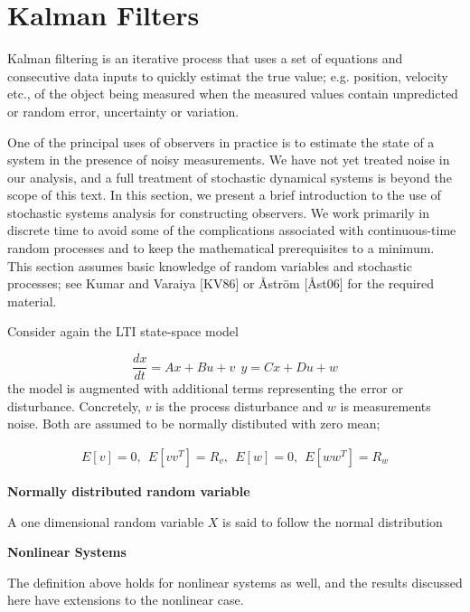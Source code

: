 \chapter{Kalman Filters}
\label{kalman_filters}

Kalman filtering is an iterative process that uses a set of equations and consecutive data inputs to quickly estimat the 
true value; e.g. position, velocity etc., of the object being measured when the measured values contain unpredicted or 
random error, uncertainty or variation.

One of the principal uses of observers in practice is to estimate the state of a
system in the presence of noisy measurements. We have not yet treated noise in our
analysis, and a full treatment of stochastic dynamical systems is beyond the scope
of this text. In this section, we present a brief introduction to the use of stochastic
systems analysis for constructing observers. We work primarily in discrete time to
avoid some of the complications associated with continuous-time random processes
and to keep the mathematical prerequisites to a minimum. This section assumes
basic knowledge of random variables and stochastic processes; see Kumar and
Varaiya [KV86] or Åström [Åst06] for the required material.

Consider again the LTI state-space model

\begin{equation}
\frac{dx}{dt} = Ax + Bu +v  ~~ y = Cx + Du +w 
\end{equation}
the model is augmented with additional terms representing the error or disturbance. Concretely,
$v$ is the process disturbance and $w$ is measurements noise. Both are assumed to be normally distibuted with zero mean;

\begin{eqnarray}
E[v] = 0, ~~ E[vv^T] = R_v, ~~ E[w] = 0, ~~ E[ww^T] = R_w 
\label{noise_proccess_1} 
\end{eqnarray}



\begin{framed}
\theoremstyle{remark}
\begin{remark}{\textbf{Normally distributed random variable}}

A one dimensional random variable $X$ is said to follow the normal distribution
\end{remark}
\end{framed}


\begin{framed}
\theoremstyle{remark}
\begin{remark}{\textbf{Nonlinear Systems}}

The definition above holds for nonlinear systems as well, and the results discussed here have extensions to the nonlinear case.
\end{remark}
\end{framed}

